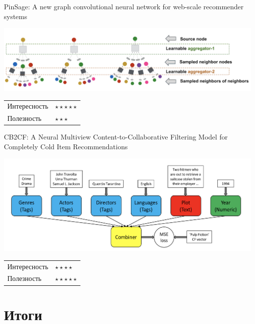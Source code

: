 \documentclass[11pt,aspectratio=169]{beamer}
\begin{document}
\begin{frame}{PinSage: A new graph convolutional neural network for web-scale recommender systems \cite{PINSAGE}}

\begin{center}
\includegraphics[scale=0.3]{images/pinnersage.png}
\end{center}

\begin{tabular}{l l}
Интересность & $\star\star\star\star\star$ \\
Полезность & $\star\star\star$
\end{tabular}

\end{frame}

\begin{frame}{CB2CF: A Neural Multiview Content-to-Collaborative Filtering Model for Completely Cold Item Recommendations	 \cite{CB2CF}}

\begin{center}
\includegraphics[scale=0.4]{images/cf2cf.png}
\end{center}

\begin{tabular}{l l}
Интересность & $\star\star\star\star$ \\
Полезность & $\star\star\star\star\star$
\end{tabular}

\end{frame}

\section{Итоги}
\end{document}
